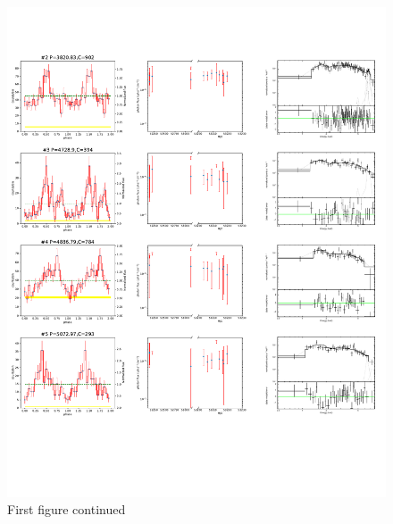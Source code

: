 \documentclass[fleqn,usenatbib]{mnras}
\begin{document}
  \begin{figure}
    \centering
    \includegraphics[page=6,scale=0.90,trim=0 100 0 20,clip]{plot_figure_LW.pdf}
    \caption{First figure continued}
  \end{figure}
  

\end{document}
